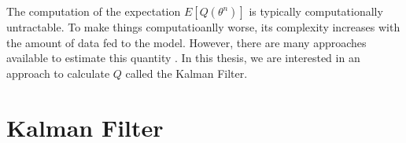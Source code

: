 \documentclass[mscthesis]{usiinfthesis}
\begin{document}
The computation of the expectation $E[Q(\theta^n)]$ is typically computationally untractable. To make things computatioanlly worse, its complexity increases with the amount of data fed to the model. However, there are many approaches available to estimate this quantity \cite{book:EMBook}. In this thesis, we are interested in an approach to calculate $Q$ called the Kalman Filter.

%
%


%
%
%
%



\section{Kalman Filter}
\label{sec:kalman}
\end{document}
